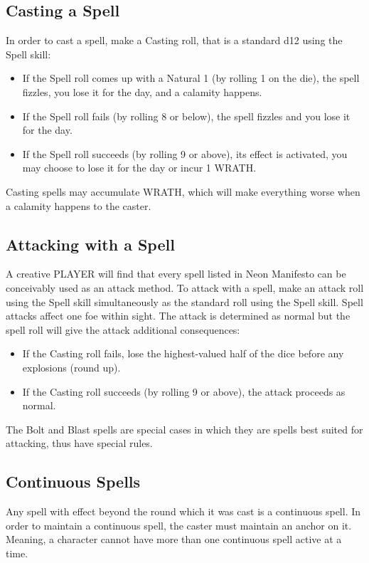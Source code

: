 \subsection{Casting a Spell}
In order to cast a spell, make a Casting roll, that is a standard d12 using the Spell skill:
\begin{itemize}
    \item If the Spell roll comes up with a Natural 1 (by rolling 1 on the die), the spell fizzles, you lose it for the day, and a calamity happens.
    \item If the Spell roll fails (by rolling 8 or below), the spell fizzles and you lose it for the day.
    \item If the Spell roll succeeds (by rolling 9 or above), its effect is activated, you may choose to lose it for the day or incur 1 WRATH.
\end{itemize}

Casting spells may accumulate WRATH, which will make everything worse when a calamity happens to the caster.

\subsection{Attacking with a Spell}
A creative PLAYER will find that every spell listed in Neon Manifesto can be conceivably used as an attack method. To attack with a spell, make an attack roll using the Spell skill simultaneously as the standard roll using the Spell skill. Spell attacks affect one foe within sight. The attack is determined as normal but the spell roll will give the attack additional consequences:
\begin{itemize}
    \item If the Casting roll fails, lose the highest-valued half of the dice before any explosions (round up).
    \item If the Casting roll succeeds (by rolling 9 or above), the attack proceeds as normal.
\end{itemize}

The Bolt and Blast spells are special cases in which they are spells best suited for attacking, thus have special rules.

\subsection{Continuous Spells}
Any spell with effect beyond the round which it was cast is a continuous spell. In order to maintain a continuous spell, the caster must maintain an anchor on it. Meaning, a character cannot have more than one continuous spell active at a time.

